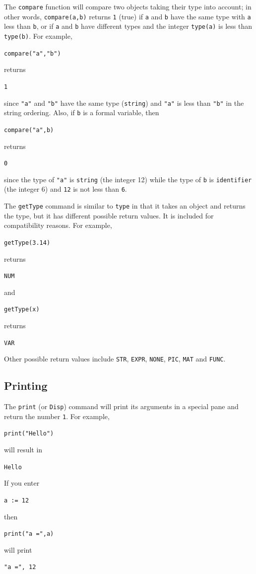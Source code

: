 \documentclass[a4paper,11pt]{book}
\begin{document}
The \texttt{compare} function will compare two objects
taking their type into account; in other words, \texttt{compare(a,b)}
returns \texttt{1} (true) if \texttt{a} and \texttt{b} have the same
type with \texttt{a} less than \texttt{b}, or if \texttt{a} and
\texttt{b} have different types and the integer \texttt{type(a)} is
less than \texttt{type(b)}.  For example,
\begin{center}
{\tt compare("a","b")}
\end{center}
returns
\begin{center}
{\tt 1}
\end{center}
since \texttt{"a"} and \texttt{"b"} have the same type
(\texttt{string}) and \texttt{"a"} is less than \texttt{"b"} in the
string ordering.  Also, if \texttt{b} is a formal variable, then
\begin{center}
{\tt compare("a",b)}
\end{center}
returns
\begin{center}
{\tt 0}
\end{center}
since the type of \texttt{"a"} is \texttt{string} (the integer 12)
while the type of \texttt{b} is \texttt{identifier} (the integer 6)
and \texttt{12} is not less than \texttt{6}.

The \texttt{getType} command is similar to \texttt{type} in that it
takes an object and returns the type, but it has different possible
return values.  It is included for compatibility reasons.
For example,
\begin{center}
{\tt getType(3.14)}
\end{center}
returns
\begin{center}
{\tt NUM}
\end{center}
and 
\begin{center}
{\tt getType(x)}
\end{center}
returns 
\begin{center}
{\tt VAR}
\end{center}
Other possible return values include \texttt{STR}, \texttt{EXPR},
\texttt{NONE}, \texttt{PIC}, \texttt{MAT} and \texttt{FUNC}.

\subsection{Printing}

The \texttt{print} (or \texttt{Disp}) command
will print its arguments in a special pane and return the number
\texttt{1}.  For example, 
\begin{center}
{\tt print("Hello")}
\end{center}
will result in
\begin{center}
{\tt Hello}
\end{center}
If you enter
\begin{center}
{\tt a := 12}
\end{center}
then
\begin{center}
{\tt print("a =",a)}
\end{center}
will print
\begin{center}
{\tt "a =", 12}
\end{center}
\end{document}
